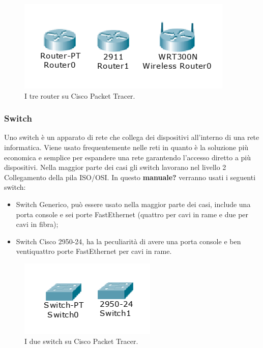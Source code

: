 \begin{figure}[htbp]
    \centerline{\includegraphics[scale=.5]{images/02.packet-tracer/router.png}}
    \caption{I tre router su Cisco Packet Tracer.}
\end{figure}

\subsubsection{Switch}
Uno switch è un apparato di rete che collega dei dispositivi all'interno di una rete informatica. Viene usato frequentemente nelle reti in quanto è la soluzione più economica e semplice per espandere una rete garantendo l'accesso diretto a più dispositivi. Nella maggior parte dei casi gli switch lavorano nel livello 2 Collegamento della pila ISO/OSI. \newline
\smallskip
\newline
In questo \textbf{manuale?} verranno usati i seguenti switch:

\begin{itemize}
    \item Switch Generico, può essere usato nella maggior parte dei casi, include una porta console e sei porte FastEthernet (quattro per cavi in rame e due per cavi in fibra);
    \item Switch Cisco 2950-24, ha la peculiarità di avere una porta console e ben ventiquattro porte FastEthernet per cavi in rame.
\end{itemize}

\begin{figure}[htbp]
    \centerline{\includegraphics[scale=.5]{images/02.packet-tracer/switch.png}}
    \caption{I due switch su Cisco Packet Tracer.}
\end{figure}

